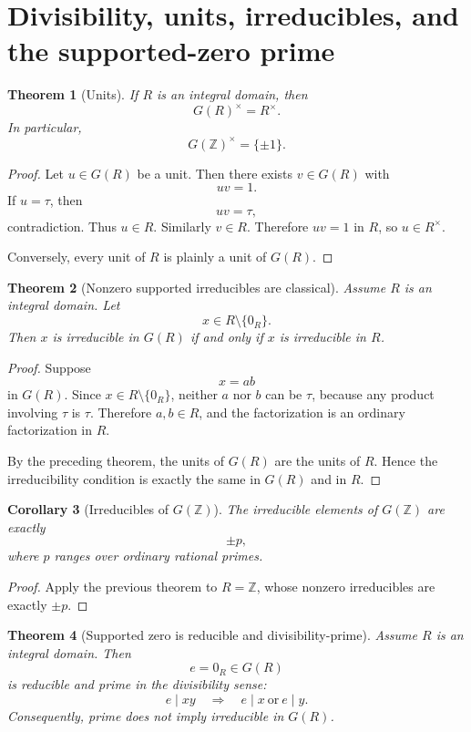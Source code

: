 \documentclass[11pt]{article}
\newtheorem{theorem}{Theorem}[section]
\newtheorem{corollary}[theorem]{Corollary}
\newcommand{\ZZ}{\mathbb Z}
\begin{document}
\section{Divisibility, units, irreducibles, and the supported-zero prime}

\begin{theorem}[Units]
If \(R\) is an integral domain, then
\[
G(R)^\times=R^\times.
\]
In particular,
\[
G(\ZZ)^\times=\{\pm1\}.
\]
\end{theorem}

\begin{proof}
Let \(u\in G(R)\) be a unit. Then there exists \(v\in G(R)\) with
\[
uv=1.
\]
If \(u=\tau\), then
\[
uv=\tau,
\]
contradiction. Thus \(u\in R\). Similarly \(v\in R\). Therefore \(uv=1\) in \(R\), so \(u\in R^\times\).

Conversely, every unit of \(R\) is plainly a unit of \(G(R)\).
\end{proof}

\begin{theorem}[Nonzero supported irreducibles are classical]
Assume \(R\) is an integral domain. Let
\[
x\in R\setminus\{0_R\}.
\]
Then \(x\) is irreducible in \(G(R)\) if and only if \(x\) is irreducible in \(R\).
\end{theorem}

\begin{proof}
Suppose
\[
x=ab
\]
in \(G(R)\). Since \(x\in R\setminus\{0_R\}\), neither \(a\) nor \(b\) can be \(\tau\), because any product involving \(\tau\) is \(\tau\). Therefore \(a,b\in R\), and the factorization is an ordinary factorization in \(R\).

By the preceding theorem, the units of \(G(R)\) are the units of \(R\). Hence the irreducibility condition is exactly the same in \(G(R)\) and in \(R\).
\end{proof}

\begin{corollary}[Irreducibles of \(G(\ZZ)\)]
The irreducible elements of \(G(\ZZ)\) are exactly
\[
\pm p,
\]
where \(p\) ranges over ordinary rational primes.
\end{corollary}

\begin{proof}
Apply the previous theorem to \(R=\ZZ\), whose nonzero irreducibles are exactly \(\pm p\).
\end{proof}

\begin{theorem}[Supported zero is reducible and divisibility-prime]
Assume \(R\) is an integral domain. Then
\[
e=0_R\in G(R)
\]
is reducible and prime in the divisibility sense:
\[
e\mid xy
\quad\Longrightarrow\quad
e\mid x\ \text{or}\ e\mid y.
\]
Consequently, prime does not imply irreducible in \(G(R)\).
\end{theorem}
\end{document}
